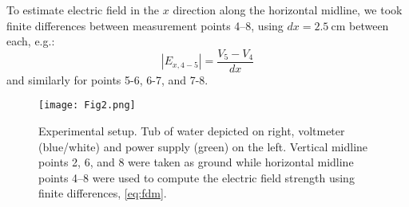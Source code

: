﻿\documentclass[10pt,journal,twoside]{IEEEtran}
\begin{document}
To estimate electric field in the $x$ direction along the horizontal midline, we took finite differences between measurement points 4--8, using $dx=\qty{2.5}{\centi\meter}$ between each, e.g.:
\begin{equation}
| E_{x,4-5} | = \dfrac{V_5 - V_4}{dx} 
\label{eq:fdm}
\end{equation}
and similarly for points 5-6, 6-7, and 7-8. 


\begin{figure}
\begin{center}
\texttt{[image: Fig2.png]}
\end{center}
\caption{Experimental setup. Tub of water depicted on right, voltmeter (blue/white) and power supply (green) on the left. Vertical midline points 2, 6, and 8 were taken as ground while horizontal midline points 4--8 were used to compute the electric field strength using finite differences, \cref{eq:fdm}.}
\label{fig:2}
\end{figure}

\end{document}
